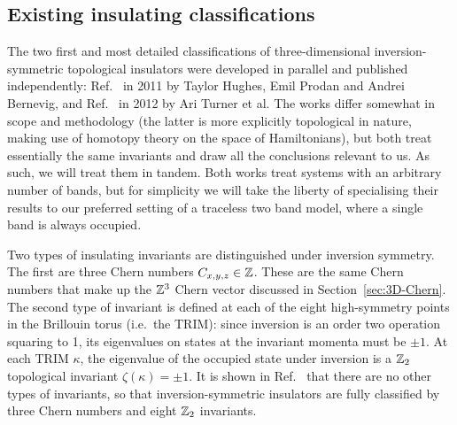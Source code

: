 \subsection{Existing insulating classifications}\label{sec:inversion-existing}

The two first and most detailed classifications of three-dimensional inversion-symmetric topological insulators were developed in parallel and published independently: Ref.~\cite{Hughes_inversion} in 2011 by Taylor Hughes, Emil Prodan and Andrei Bernevig, and Ref.~\cite{Turner_inversion} in 2012 by Ari Turner et al. The works differ somewhat in scope and methodology (the latter is more explicitly topological in nature, making use of homotopy theory on the space of Hamiltonians), but both treat essentially the same invariants and draw all the conclusions relevant to us. As such, we will treat them in tandem. Both works treat systems with an arbitrary number of bands, but for simplicity we will take the liberty of specialising their results to our preferred setting of a traceless two band model, where a single band is always occupied.

Two types of insulating invariants are distinguished under inversion symmetry. The first are three Chern numbers $C_{x,y,z}\in\mathbb{Z}$. These are the same Chern numbers that make up the $\mathbb{Z}^3$ Chern vector discussed in Section~\ref{sec:3D-Chern}. The second type of invariant is defined at each of the eight high-symmetry points in the Brillouin torus (i.e.\ the TRIM): since inversion is an order two operation squaring to 1, its eigenvalues on states at the invariant momenta must be $\pm1$. At each TRIM $\kappa$, the eigenvalue of the occupied state under inversion is a $\mathbb{Z}_2$ topological invariant $\zeta(\kappa)=\pm1$. It is shown in Ref.~\cite{Turner_inversion} that there are no other types of invariants, so that inversion-symmetric insulators are fully classified by three Chern numbers and eight $\mathbb{Z}_2$ invariants.

